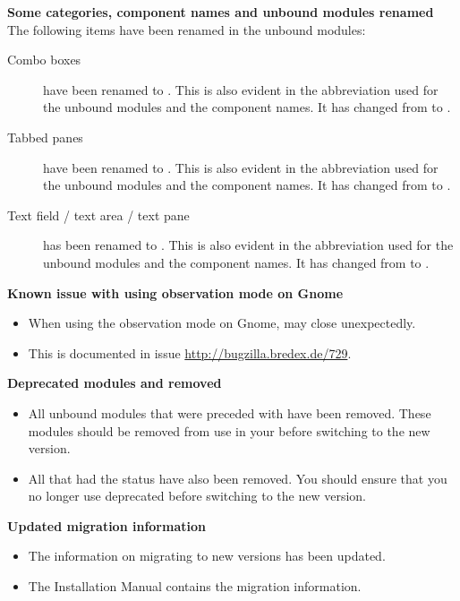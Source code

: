\textbf{Some categories, component names and unbound modules renamed}
The following items have been renamed in the unbound modules:
\begin{description}
\item [Combo boxes]{ have been renamed to . This is also evident in the abbreviation used for the unbound modules and the component names. It has changed from  to .}
\item [Tabbed panes]{ have been renamed to . This is also evident in the abbreviation used for the unbound modules and the component names. It has changed from  to .}
\item [Text field / text area / text pane]{ has been renamed to . This is also evident in the abbreviation used for the unbound modules and the component names. It has changed from  to .}
\end{description}

\textbf{Known issue with using observation mode on Gnome}
\begin{itemize}
\item When using the observation mode on Gnome, \app{} may close unexpectedly. 
\item This is documented in issue \url{http://bugzilla.bredex.de/729}.
\end{itemize}

\textbf{Deprecated modules and \gdsteps{} removed}
\begin{itemize}
\item All unbound modules that were preceded with  have been removed. These modules should be removed from use in your \gdprojects{} before switching to the new version. 
\item All \gdsteps{} that had the status  have also been removed. You should ensure that you no longer use deprecated \gdsteps{} before switching to the new version. 
\end{itemize}

\textbf{Updated migration information}
\begin{itemize}
\item The information on migrating to new versions has been updated.
\item The Installation Manual contains the migration information. 
\end{itemize}
